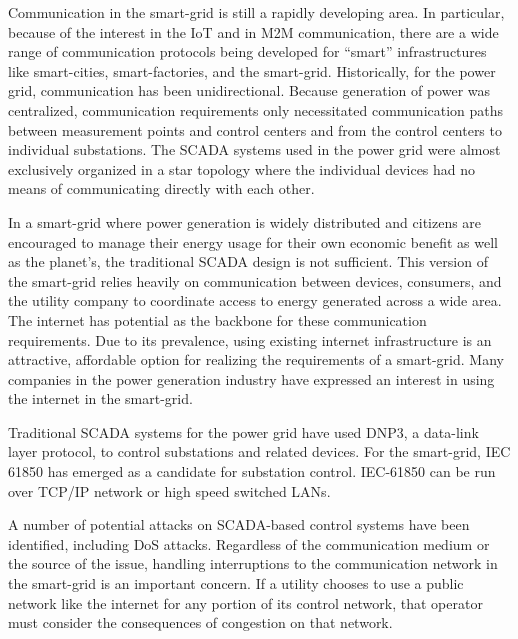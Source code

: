 Communication in the smart-grid is still a rapidly developing area.
In particular, because of the interest in the \ac{IoT} and in \ac{M2M} communication, there are a wide range of communication protocols being developed for ``smart'' infrastructures like smart-cities, smart-factories, and the smart-grid.
Historically, for the power grid, communication has been unidirectional.
Because generation of power was centralized, communication requirements only necessitated communication paths between measurement points and control centers and from the control centers to individual substations\cite{smartgrid-comm1}.
The \ac{SCADA} systems used in the power grid were almost exclusively organized in a star topology where the individual devices had no means of communicating directly with each other.

In a smart-grid where power generation is widely distributed and citizens are encouraged to manage their energy usage for their own economic benefit as well as the planet's, the traditional \ac{SCADA} design is not sufficient\cite{smartgrid-comm1}\cite{smartgrid-comm-lastmile}\cite{smartgrid-comm-m2m}.
This version of the smart-grid relies heavily on communication between devices, consumers, and the utility company to coordinate access to energy generated across a wide area.
The internet has potential as the backbone for these communication requirements.
Due to its prevalence, using existing internet infrastructure is an attractive, affordable option for realizing the requirements of a smart-grid\cite{smartgrid-comm-germany}\cite{smartgrid-comm-lastmile}.
Many companies in the power generation industry have expressed an interest in using the internet in the smart-grid\cite{smartgrid-comm-doe}.

Traditional \ac{SCADA} systems for the power grid have used \ac{DNP3}, a data-link layer protocol, to control substations and related devices\cite{dnp3}.
For the smart-grid, IEC 61850 has emerged as a candidate for substation control\cite{iec61850-1}\cite{iec61850-2}\cite{iec61850-3}.
IEC-61850 can be run over TCP/IP network or high speed switched LANs\cite{iec61850-3}.

A number of potential attacks on \ac{SCADA}-based control systems have been identified\cite{smartgrid-security}\cite{smartgrid-attacks}, including \ac{DoS} attacks\cite{scada-attack-dos}\cite{dnp3-attack}.
Regardless of the communication medium or the source of the issue, handling interruptions to the communication network in the smart-grid is an important concern.
If a utility chooses to use a public network like the internet for any portion of its control network, that operator must consider the consequences of congestion on that network\cite{intelligent-control}\cite{plc-communication}\cite{wireless-congestion}.

